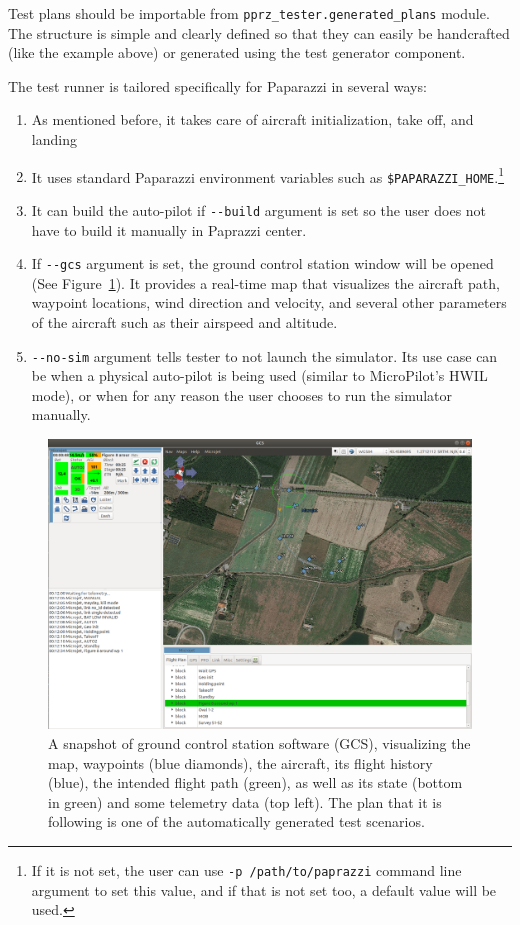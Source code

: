 Test plans should be importable from \verb|pprz_tester.generated_plans| module. The structure is simple and clearly defined so that they can easily be handcrafted (like the example above) or generated using the test generator component.

The test runner is tailored specifically for Paparazzi in several ways:
\begin{enumerate}
    \item %
As mentioned before, it takes care of aircraft initialization, take off, and landing
    \item %
It uses standard Paparazzi environment variables such as \verb|$PAPARAZZI_HOME|.\footnote{If it is not set, the user can use \texttt{-p /path/to/paprazzi} command line argument to set this value, and if that is not set too, a default value will be used.} 
    \item %
It can build the auto-pilot if \verb|--build| argument is set so the user does not have to build it manually in Paprazzi center. 

    \item %
If \verb|--gcs| argument is set, the ground control station window will be opened (See Figure~\ref{fig:paparazzi_gcs}). It provides a real-time map that visualizes the aircraft path, waypoint locations, wind direction and velocity, and several other parameters of the aircraft such as their airspeed and altitude. 
    \item %
\verb|--no-sim| argument tells tester to not launch the simulator. Its use case can be when a physical auto-pilot is being used (similar to MicroPilot's HWIL mode), or when for any reason the user chooses to run the simulator manually. 
\end{enumerate}

\begin{figure}
    \centering
    \includegraphics[width=\textwidth]{pprz_tester_files/GCS.png}
    \caption{A snapshot of ground control station software (GCS), visualizing the map, waypoints (blue diamonds), the aircraft, its flight history (blue), the intended flight path (green), as well as its state (bottom in green) and some telemetry data (top left). The plan that it is following is one of the automatically generated test scenarios.}
    \label{fig:paparazzi_gcs}
\end{figure}


